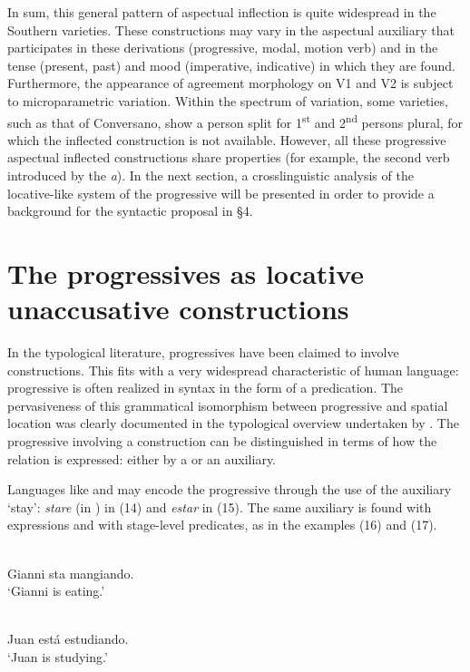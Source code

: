\documentclass[output=paper]{langsci/langscibook}
\begin{document}
In sum, this general pattern of aspectual inflection is quite widespread in the Southern varieties. These constructions may vary in the aspectual auxiliary that participates in these derivations (progressive, modal, motion verb) and in the tense (present, past) and mood (imperative, indicative) in which they are found. Furthermore, the appearance of agreement morphology on V1 and V2 is subject to microparametric variation. Within the spectrum of variation, some varieties, such as that of Conversano, show a person split for 1\textsuperscript{st} and 2\textsuperscript{nd} persons plural, for which the inflected construction is not available. However, all these progressive aspectual inflected constructions share  properties (for example, the second verb introduced by the  \textit{a}). In the next section, a crosslinguistic analysis of the locative-like system of the progressive will be presented in order to provide a background for the syntactic proposal in §4.

\section{The progressives as locative unaccusative constructions}%
In the typological literature, progressives have been claimed to involve  constructions. This fits with a very widespread characteristic of human language: progressive is often realized in syntax in the form of a  predication. The pervasiveness of this grammatical isomorphism between progressive and spatial location was clearly documented in the typological overview undertaken by \citet{Bybee1994}. The progressive involving a  construction can be distinguished in terms of how the  relation is expressed: either by a  or an auxiliary.

Languages like  and  may encode the progressive through the use of the auxiliary ‘stay’: \textit{stare} (in ) in (14) and \textit{estar} in  (15). The same auxiliary is found with  expressions and with stage-level predicates, as in the  examples (16) and (17).

\ea%
        \\
        Gianni sta mangiando.\\
    \glt ‘Gianni is eating.’
\z

\ea%
         \\
        Juan está estudiando.\\
    \glt ‘Juan is studying.’
\z
\end{document}
